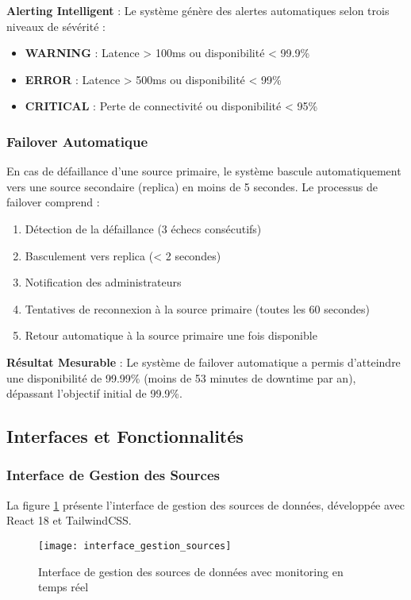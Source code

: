 \textbf{Alerting Intelligent} : Le système génère des alertes automatiques selon trois niveaux de sévérité :
\begin{itemize}
    \item \textbf{WARNING} : Latence > 100ms ou disponibilité < 99.9\%
    \item \textbf{ERROR} : Latence > 500ms ou disponibilité < 99\%
    \item \textbf{CRITICAL} : Perte de connectivité ou disponibilité < 95\%
\end{itemize}

\subsubsection{Failover Automatique}

En cas de défaillance d'une source primaire, le système bascule automatiquement vers une source secondaire (replica) en moins de 5 secondes. Le processus de failover comprend :
\begin{enumerate}
    \item Détection de la défaillance (3 échecs consécutifs)
    \item Basculement vers replica (< 2 secondes)
    \item Notification des administrateurs
    \item Tentatives de reconnexion à la source primaire (toutes les 60 secondes)
    \item Retour automatique à la source primaire une fois disponible
\end{enumerate}

\textbf{Résultat Mesurable} : Le système de failover automatique a permis d'atteindre une disponibilité de 99.99\% (moins de 53 minutes de downtime par an), dépassant l'objectif initial de 99.9\%.

\subsection{Interfaces et Fonctionnalités}

\subsubsection{Interface de Gestion des Sources}

La figure \ref{fig:interface_gestion_sources} présente l'interface de gestion des sources de données, développée avec React 18 et TailwindCSS.

\begin{figure}[htpb]
\centering
\texttt{[image: interface\_gestion\_sources]}
\caption{Interface de gestion des sources de données avec monitoring en temps réel}
\label{fig:interface_gestion_sources}
\end{figure}

